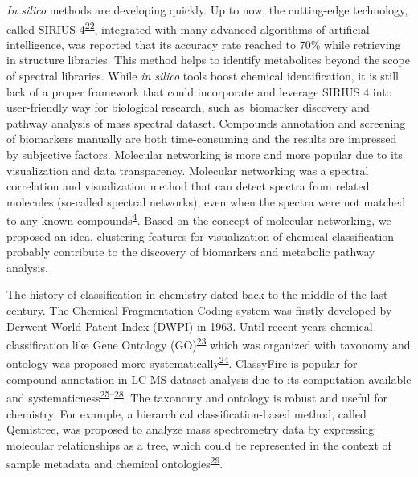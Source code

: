 \documentclass[
]{article}
\begin{document}
\emph{In silico} methods are developing quickly. Up to now, the
cutting-edge technology, called SIRIUS
4\textsuperscript{\protect\hyperlink{ref-duhrkop_sirius_2019}{22}},
integrated with many advanced algorithms of artificial intelligence, was
reported that its accuracy rate reached to 70\% while retrieving in
structure libraries. This method helps to identify metabolites beyond
the scope of spectral libraries. While \emph{in silico} tools boost
chemical identification, it is still lack of a proper framework that
could incorporate and leverage SIRIUS 4 into user-friendly way for
biological research, such as~biomarker discovery and pathway analysis of
mass spectral dataset. Compounds annotation and screening of biomarkers
manually are both time-consuming and the results are impressed by
subjective factors. Molecular networking is more and more popular due to
its visualization and data transparency. Molecular networking was a
spectral correlation and visualization method that can detect spectra
from related molecules (so-called spectral networks), even when the
spectra were not matched to any known
compounds\textsuperscript{\protect\hyperlink{ref-2016a}{4}}. Based on
the concept of molecular networking, we proposed an idea, clustering
features for visualization of chemical classification probably
contribute to the discovery of biomarkers and metabolic pathway
analysis.

The history of classification in chemistry dated back to the middle of
the last century. The Chemical Fragmentation Coding system was firstly
developed by Derwent World Patent Index (DWPI) in 1963. Until recent
years chemical classification like Gene Ontology
(GO)\textsuperscript{\protect\hyperlink{ref-2000g}{23}} which was
organized with taxonomy and ontology was proposed more
systematically\textsuperscript{\protect\hyperlink{ref-2016}{24}}.
ClassyFire is popular for compound annotation in LC-MS dataset analysis
due to its computation available and
systematicness\textsuperscript{\protect\hyperlink{ref-2019bt}{25}--\protect\hyperlink{ref-2019bq}{28}}.
The taxonomy and ontology is robust and useful for chemistry. For
example, a hierarchical classification-based method, called Qemistree,
was proposed to analyze mass spectrometry data by expressing molecular
relationships as a tree, which could be represented in the context of
sample metadata and chemical
ontologies\textsuperscript{\protect\hyperlink{ref-2021b}{29}}.
\end{document}
